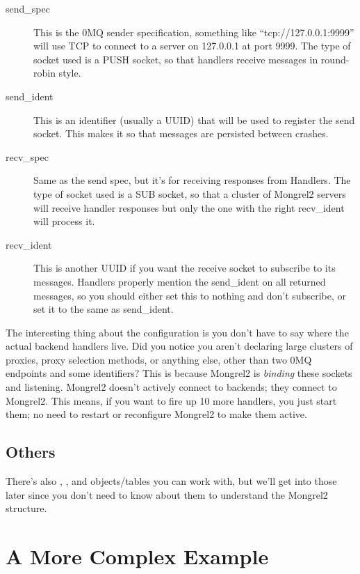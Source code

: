 \begin{description}
\item[send\_spec]  This is the 0MQ sender specification, something like ``tcp://127.0.0.1:9999'' will
    use TCP to connect to a server on 127.0.0.1 at port 9999.  The type of socket used is a PUSH
    socket, so that handlers receive messages in round-robin style.
\item[send\_ident] This is an identifier (usually a UUID) that will be used to register the send
    socket.  This makes it so that messages are persisted between crashes.
\item[recv\_spec] Same as the send spec, but it's for receiving responses from Handlers.  The type of
    socket used is a SUB socket, so that a cluster of Mongrel2 servers will receive handler responses
    but only the one with the right recv\_ident will process it.
\item[recv\_ident] This is another UUID if you want the receive socket to subscribe to its messages.
    Handlers properly mention the send\_ident on all returned messages, so you should either set this
    to nothing and don't subscribe, or set it to the same as send\_ident.
\end{description}

The interesting thing about the  configuration is you don't have to say where the
actual backend handlers live.  Did you notice you aren't declaring large clusters of proxies, proxy selection
methods, or anything else, other than two 0MQ endpoints and some identifiers?  This is because Mongrel2 is
\emph{binding} these sockets and listening.  Mongrel2 doesn't actively connect to backends; they connect
to Mongrel2.  This means, if you want to fire up 10 more handlers, you just start them; no need to restart
or reconfigure Mongrel2 to make them active.


\subsection{Others}

There's also , , and  objects/tables you can work
with, but we'll get into those later since you don't need to know about them to understand
the Mongrel2 structure.



\section{A More Complex Example}

